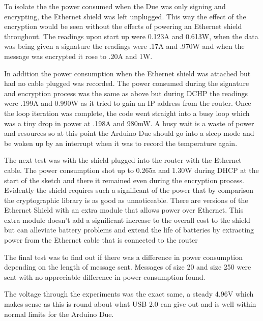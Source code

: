 To isolate the the power consumed when the Due was only signing and encrypting, the Ethernet shield was left unplugged. This way the effect of the encryption would be seen without the effects of powering an Ethernet shield throughout. 
The readings upon start up were 0.123A and 0.613W, when the data was being given a signature the readings were .17A and .970W and when the message was encrypted it rose to .20A and 1W. 

In addition the power consumption when the Ethernet shield was attached but had no cable plugged was recorded. The power consumed during the signature and encryption process was the same as above but during DCHP the readings were .199A and 0.990W as it tried to gain an IP address from the router. Once the loop iteration was complete, the code went straight into a busy loop which was a tiny drop in power at .198A and 980mW. A busy wait is a waste of power and resources so at this point the Arduino Due should go into a sleep mode and be woken up by an interrupt when it was to record the temperature again. 

The next test was with the shield plugged into the router with the Ethernet cable. The power consumption shot up to 0.265a and 1.30W during DHCP at the start of the sketch and there it remained even during the encryption process. Evidently the shield requires such a significant of the power that by comparison the cryptographic library is as good as unnoticeable. There are versions of the Ethernet Shield with an extra module that allows power over Ethernet. This extra module doesn't add a significant increase to the overall cost to the shield but can alleviate battery problems and extend the life of batteries by extracting power from the Ethernet cable that is connected to the router

The final test was to find out if there was a difference in power consumption depending on the length of message sent. Messages of size 20 and size 250 were sent with no appreciable difference in power consumption found.


The voltage through the experiments was the exact same, a steady 4.96V which makes sense as this is round about what USB 2.0 can give out and is well within normal limits for the Arduino Due.




